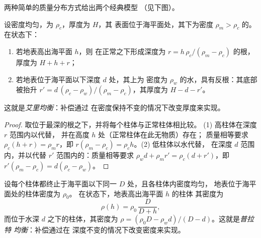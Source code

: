 两种简单的质量分布方式给出两个经典模型
（见下图）。

\begin{proposition}[艾里均衡]\label{prop:b1:isostasy-gravity:airy}
设密度均匀，为 $\rho_c$，厚度为 $H$，其
表面位于海平面处，其下为密度 $\rho_m > \rho_c$ 的。
在状态下：
\begin{enumerate}
  \item 若地表高出海平面 $h$，则
        在正常之下形成深度为 $r = h\,\rho_c/(\rho_m - \rho_c)$ 的根，
        厚度为 $H + h + r$；
  \item 若地表位于海平面以下深度 $d$ 处，其上为
        密度为 $\rho_w$ 的水，具有反根：其底部被抬升
        $r' = d\,(\rho_c - \rho_w)/(\rho_m - \rho_c)$，其厚度为
        $H - d - r'$。
\end{enumerate}
这就是\emph{艾里均衡}：补偿通过
在密度保持不变的情况下改变厚度来实现。
\end{proposition}

\begin{proof}
取位于最深的根之下，并将每个柱体与正常柱体相比较。
(1) 高柱体在深度 $r$ 范围内以代替，
并在高度 $h$ 处（正常柱体在此无物质）存在；
质量相等要求 $\rho_c(h + r) = \rho_m r$，即
$r(\rho_m - \rho_c) = \rho_c h$。(2) 低柱体以水代替，
在深度 $d$ 范围内，并以代替 $r'$ 范围内的：质量相等要求
$\rho_w d + \rho_m r' = \rho_c(d + r')$，即 $r'(\rho_m - \rho_c) =
d(\rho_c - \rho_w)$。
\end{proof}

\begin{proposition}[普拉特均衡]\label{prop:b1:isostasy-gravity:pratt}
设每个柱体都终止于海平面以下同一 $D$ 处，且各柱体内密度均匀，
地表位于海平面处的柱体密度为 $\rho_0$。
在状态下，地表高出海平面 $h$ 的柱体
其密度为
\[
  \rho(h) = \rho_0\,\frac{D}{D + h},
\]
而位于水深 $d$ 之下的柱体，其密度为
$\rho = (\rho_0 D - \rho_w d)/(D - d)$。这就是\emph{普拉特
均衡}：补偿通过在
深度不变的情况下改变密度来实现。
\end{proposition}

